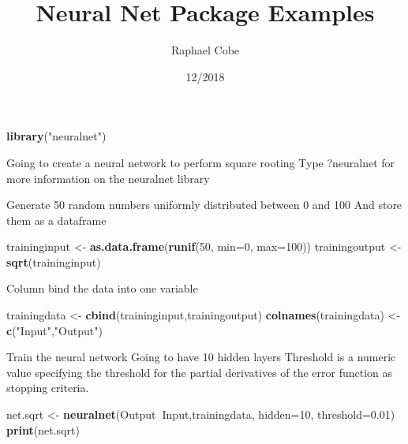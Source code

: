 \documentclass[]{article}
\title{Neural Net Package Examples}
\author{Raphael Cobe}
\date{12/2018}
\newenvironment{Shaded}{\begin{snugshade}}{\end{snugshade}}
\newcommand{\DataTypeTok}[1]{\textcolor[rgb]{0.13,0.29,0.53}{#1}}
\newcommand{\DecValTok}[1]{\textcolor[rgb]{0.00,0.00,0.81}{#1}}
\newcommand{\FloatTok}[1]{\textcolor[rgb]{0.00,0.00,0.81}{#1}}
\newcommand{\KeywordTok}[1]{\textcolor[rgb]{0.13,0.29,0.53}{\textbf{#1}}}
\newcommand{\NormalTok}[1]{#1}
\newcommand{\OperatorTok}[1]{\textcolor[rgb]{0.81,0.36,0.00}{\textbf{#1}}}
\newcommand{\StringTok}[1]{\textcolor[rgb]{0.31,0.60,0.02}{#1}}
\begin{document}
\maketitle

\begin{Shaded}
\begin{Highlighting}[]
\KeywordTok{library}\NormalTok{(}\StringTok{"neuralnet"}\NormalTok{)}
\end{Highlighting}
\end{Shaded}

Going to create a neural network to perform square rooting Type
?neuralnet for more information on the neuralnet library

Generate 50 random numbers uniformly distributed between 0 and 100 And
store them as a dataframe

\begin{Shaded}
\begin{Highlighting}[]
\NormalTok{traininginput <-}\StringTok{  }\KeywordTok{as.data.frame}\NormalTok{(}\KeywordTok{runif}\NormalTok{(}\DecValTok{50}\NormalTok{, }\DataTypeTok{min=}\DecValTok{0}\NormalTok{, }\DataTypeTok{max=}\DecValTok{100}\NormalTok{))}
\NormalTok{trainingoutput <-}\StringTok{ }\KeywordTok{sqrt}\NormalTok{(traininginput)}
\end{Highlighting}
\end{Shaded}

Column bind the data into one variable

\begin{Shaded}
\begin{Highlighting}[]
\NormalTok{trainingdata <-}\StringTok{ }\KeywordTok{cbind}\NormalTok{(traininginput,trainingoutput)}
\KeywordTok{colnames}\NormalTok{(trainingdata) <-}\StringTok{ }\KeywordTok{c}\NormalTok{(}\StringTok{"Input"}\NormalTok{,}\StringTok{"Output"}\NormalTok{)}
\end{Highlighting}
\end{Shaded}

Train the neural network Going to have 10 hidden layers Threshold is a
numeric value specifying the threshold for the partial derivatives of
the error function as stopping criteria.

\begin{Shaded}
\begin{Highlighting}[]
\NormalTok{net.sqrt <-}\StringTok{ }\KeywordTok{neuralnet}\NormalTok{(Output}\OperatorTok{~}\NormalTok{Input,trainingdata, }\DataTypeTok{hidden=}\DecValTok{10}\NormalTok{, }\DataTypeTok{threshold=}\FloatTok{0.01}\NormalTok{)}
\KeywordTok{print}\NormalTok{(net.sqrt)}
\end{Highlighting}
\end{Shaded}
\end{document}
